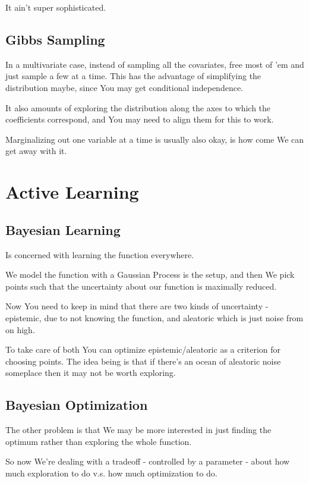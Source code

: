 \documentclass{article}
\begin{document}
		It ain't super sophisticated.
		
	\subsection{Gibbs Sampling}
	
		In a multivariate case, instead of sampling all the covariates, free most of 'em and just sample a few at a time. This has the advantage of simplifying the distribution maybe, since You may get conditional independence.
		
		It also amounts of exploring the distribution along the axes to which the coefficients correspond, and You may need to align them for this to work.
		
		Marginalizing out one variable at a time is usually also okay, is how come We can get away with it.
		
\section{Active Learning}

	\subsection{Bayesian Learning}
	
		Is concerned with learning the function everywhere.
		
		We model the function with a Gaussian Process is the setup, and then We pick points such that the uncertainty about our function is maximally reduced.
		
		Now You need to keep in mind that there are two kinds of uncertainty - epistemic, due to not knowing the function, and aleatoric which is just noise from on high.
		
		To take care of both You can optimize epistemic/aleatoric as a criterion for choosing points. The idea being is that if there's an ocean of aleatoric noise someplace then it may not be worth exploring.
		
	\subsection{Bayesian Optimization}
	
		The other problem is that We may be more interested in just finding the optimum rather than exploring the whole function.
		
		So now We're dealing with a tradeoff - controlled by a parameter - about how much exploration to do v.s. how much optimization to do.
		
\end{document}
